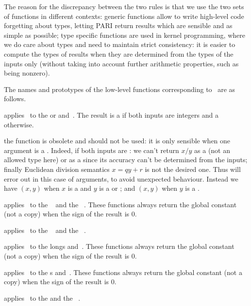 The reason for the discrepancy between the two rules is that we use the two
sets of functions in different contexts: generic functions allow to write
high-level code forgetting about types, letting PARI return results which are
sensible and as simple as possible; type specific functions are used in
kernel programming, where we do care about types and need to maintain strict
consistency: it is easier to compute the types of results when they are
determined from the types of the inputs only (without taking into account
further arithmetic properties, such as being nonzero).
\smallskip

The names and prototypes of the low-level functions corresponding
to \op\ are as follows.

 applies \op\ to
the  or   and~. The result is a 
if both inputs are integers and a  otherwise.

 the  function is obsolete
and should not be used: it is only sensible when one argument is a .
Indeed, if both inputs are  : we can't return $x/y$ as a 
(not an allowed type here) or as a  since its accuracy can't be
determined from the inputs; finally Euclidean division semantics $x = qy + r$
is not the desired one. Thus  will error out in this case of
 arguments, to avoid unexpected behaviour. Instead we have
$(x,y)$ when $x$ is a  and $y$ is a  or
; and $(x,y)$ when $y$ is a .

 applies \op\ to the
~ and the ~.
 These functions always return the global constant
 (not a copy) when the sign of the result is $0$.

 applies \op\ to the
~ and the ~.

 applies \op\ to the longs
 and~. These functions always return the global constant
 (not a copy) when the sign of the result is $0$.

 applies \op\ to the
s  and~. These functions always return the global
constant  (not a copy) when the sign of the result is $0$.

 applies \op\ to the
  and the ~.

